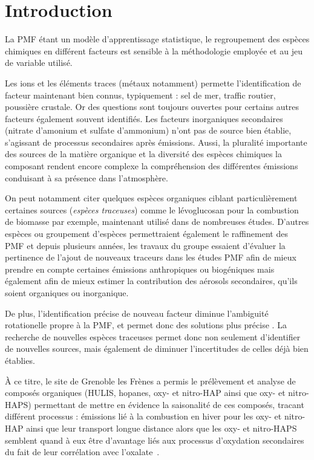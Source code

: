 
\section{Introduction}%
\label{sec:introduction}

La PMF étant un modèle d'apprentissage statistique, le regroupement des espèces chimiques
en différent facteurs est sensible à la méthodologie employée et au jeu de variable
utilisé.

Les ions et les éléments traces (métaux notamment) permette l'identification de facteur
maintenant bien connus, typiquement : sel de mer, traffic routier, poussière crustale.
Or des questions sont toujours ouvertes pour certains autres facteurs également souvent
identifiés. Les facteurs inorganiques secondaires (nitrate d'amonium et sulfate
d'ammonium) n'ont pas de source bien établie, s'agissant de processus secondaires après
émissions.
Aussi, la pluralité importante des sources de la matière organique et la diversité des
espèces chimiques la composant rendent encore complexe la compréhension des différentes
émissions conduisant à sa présence dans l'atmosphère.

On peut notamment citer quelques espèces organiques ciblant particulièrement certaines sources
(\textit{espèces traceuses}) comme le lévoglucosan pour la combustion de biomasse par
exemple, maintenant utilisé dans de nombreuses études.
D'autres espèces ou groupement d'espèces permettraient également le raffinement des PMF
et depuis plusieurs années, les travaux du groupe essaient d'évaluer la pertinence de
l'ajout de nouveaux traceurs dans les études PMF afin de mieux prendre en compte
certaines émissions anthropiques ou biogéniques mais également afin de mieux estimer la
contribution des aérosols secondaires, qu'ils soient organiques ou inorganique.

De plus, l'identification précise de nouveau facteur diminue l'ambiguité rotationelle
propre à la PMF, et permet donc des solutions plus précise \autocite{emamiEffect2017}.
La recherche de nouvelles espèces traceuses permet donc non seulement d'identifier de
nouvelles sources, mais également de diminuer l'incertitudes de celles déjà bien établies.

À ce titre, le site de Grenoble les Frènes a permis le prélèvement et analyse de composés
organiques (HULIS, hopanes, oxy- et nitro-HAP ainsi que oxy- et nitro-HAPS) permettant de
mettre en évidence la saisonalité de ces composés, tracant différent processus : émissions
lié à la combustion en hiver pour les oxy- et nitro-HAP ainsi que leur transport longue
distance alors que les oxy- et nitro-HAPS semblent quand à eux être d'avantage liés aux
processus d'oxydation secondaires du fait de leur corrélation avec
l'oxalate~\textcite{tomazSources2017a}.

